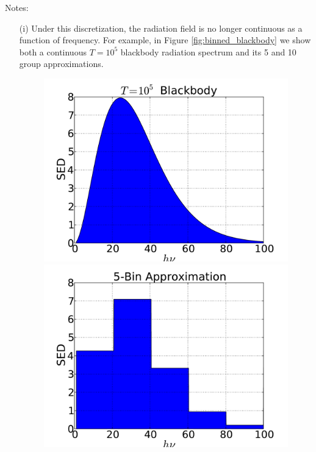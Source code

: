 \documentclass[10pt]{article}
\renewcommand{\(}{\left(}
\renewcommand{\)}{\right)}
\begin{document}
Notes:
\begin{itemize}
\item[(i)] Under this discretization, the radiation field is no longer
  continuous as a function of frequency.  For example, in Figure
  \ref{fig:binned_blackbody} we show both a continuous $T=10^5$
  blackbody radiation spectrum and its 5 and 10 group approximations.

  \begin{figure}[h]
    \centerline{\hfill
      \includegraphics[scale=0.3, trim=1.0cm 0.5cm 1.25cm 0.5cm]{blackbody.pdf}
      \includegraphics[scale=0.3, trim=1.0cm 0.5cm 1.25cm 0.5cm]{blackbody-5bin.pdf}
}
\end{figure}
\end{itemize}
\end{document}

